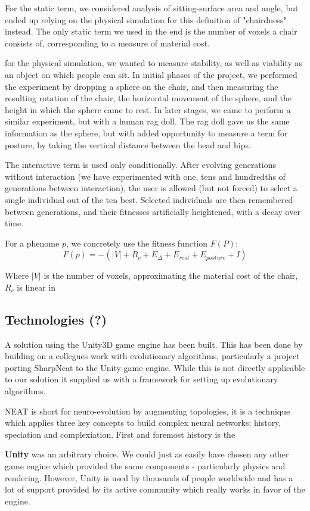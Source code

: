 For the static term, we considered analysis of sitting-surface area and angle,
but ended up relying on the physical simulation for this definition of
"chairdness" instead. The only static term we used in the end is the number of
voxels a chair consists of, corresponding to a measure of material cost.

for the physical simulation, we wanted to measure stability, as well as
viability as an object on which people can sit. In initial phases of the
project, we performed the experiment by dropping a sphere on the chair, and then
measuring the resulting rotation of the chair, the horizontal movement of the
sphere, and the height in which the sphere came to rest. In later stages, we
came to perform a similar experiment, but with a human rag doll. The rag doll
gave us the same information as the sphere, but with added opportunity to
measure a term for posture, by taking the vertical distance between the head and
hips.

The interactive term is used only conditionally. After evolving generations
without interaction (we have experimented with one, tens and hundredths of
generations between interaction), the user is allowed (but not forced) to select
a single individual out of the ten best. Selected individuals are then
remembered between generations, and their fitnesses artificially heightened,
with a decay over time.

For a phenome $p$, we concretely use the fitness function $F(P)$:
$$F(p) = -(|V| + R_c + E_{\Delta} + E_{rest} + E_{posture} + I)$$

Where $|V|$ is the number of voxels, approximating the material cost of the
chair, $R_c$ is linear in 
\subsection{Technologies (?)}

A solution using the Unity3D\cite{web:unity} game engine has been built. This has been done by building on a collegues work\cite{web:unityneat} with evolutionary algorithms, particularly a project porting SharpNeat\cite{web:sharpneat} to the Unity game engine.
While this is not directly applicable to our solution it supplied us with a framework for setting up evolutionary algorithms.

NEAT is short for neuro-evolution by augmenting topologies, it is a technique which applies three key concepts to build complex neural networks; history, speciation and complexiation. First and foremost history is the 
    
\textbf{Unity} was an arbitrary choice. We could just as easily have chosen any other game engine which provided the same components - particularly physics and rendering. However, Unity is used by thousands of people worldwide and has a lot of support provided by its active community which really works in favor of the engine.

